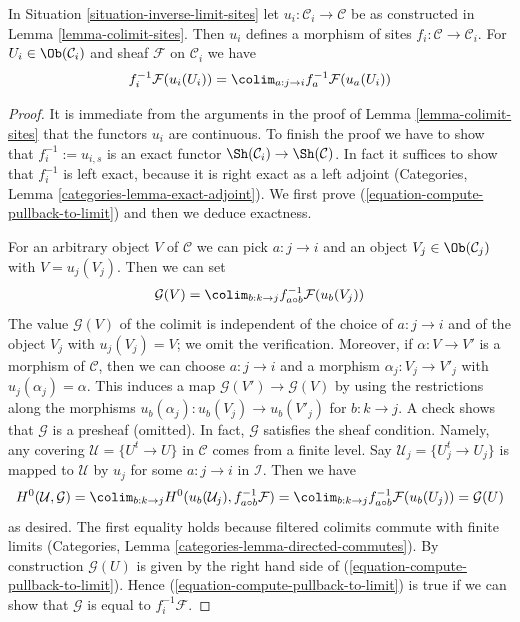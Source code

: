 \begin{lemma}
\label{lemma-compute-pullback-to-limit}
In Situation \ref{situation-inverse-limit-sites} let
$u_i : \mathcal{C}_i \to \mathcal{C}$ be as constructed in
Lemma \ref{lemma-colimit-sites}. Then $u_i$ defines a morphism
of sites $f_i : \mathcal{C} \to \mathcal{C}_i$. For
$U_i \in \Ob(\mathcal{C}_i)$ and sheaf $\mathcal{F}$ on $\mathcal{C}_i$ we have
\begin{equation}
\label{equation-compute-pullback-to-limit}
f_i^{-1}\mathcal{F}(u_i(U_i)) =
\colim_{a : j \to i} f_a^{-1}\mathcal{F}(u_a(U_i))
\end{equation}
\end{lemma}

\begin{proof}
It is immediate from the arguments in the proof of
Lemma \ref{lemma-colimit-sites} that the functors $u_i$ are continuous.
To finish the proof we have to show that $f_i^{-1} := u_{i, s}$
is an exact functor $\Sh(\mathcal{C}_i) \to \Sh(\mathcal{C})$.
In fact it suffices to show that $f_i^{-1}$ is left exact, because
it is right exact as a left adjoint
(Categories, Lemma \ref{categories-lemma-exact-adjoint}).
We first prove (\ref{equation-compute-pullback-to-limit})
and then we deduce exactness.

\medskip\noindent
For an arbitrary object $V$ of $\mathcal{C}$ we can pick $a : j \to i$
and an object $V_j \in \Ob(\mathcal{C}_j)$ with $V = u_j(V_j)$. Then we
can set
$$
\mathcal{G}(V) = \colim_{b : k \to j} f_{a \circ b}^{-1}\mathcal{F}(u_b(V_j))
$$
The value $\mathcal{G}(V)$ of the colimit is independent of the choice
of $a : j \to i$ and of the object $V_j$ with $u_j(V_j) = V$; we omit
the verification. Moreover, if $\alpha : V \to V'$ is a morphism of
$\mathcal{C}$, then we can choose $a : j \to i$ and a morphism
$\alpha_j : V_j \to V'_j$ with $u_j(\alpha_j) = \alpha$. This induces
a map $\mathcal{G}(V') \to \mathcal{G}(V)$ by using the restrictions
along the morphisms $u_b(\alpha_j) : u_b(V_j) \to u_b(V'_j)$ for
$b : k \to j$. A check
shows that $\mathcal{G}$ is a presheaf (omitted).
In fact, $\mathcal{G}$ satisfies the sheaf condition. Namely,
any covering $\mathcal{U} = \{U^t \to U\}$ in $\mathcal{C}$
comes from a finite level. Say $\mathcal{U}_j = \{U^t_j \to U_j\}$
is mapped to $\mathcal{U}$ by $u_j$ for some $a : j \to i$ in $\mathcal{I}$.
Then we have
$$
H^0(\mathcal{U}, \mathcal{G}) =
\colim_{b : k \to j} H^0(u_b(\mathcal{U}_j), f_{a \circ b}^{-1}\mathcal{F}) =
\colim_{b : k \to j} f_{a \circ b}^{-1}\mathcal{F}(u_b(U_j)) =
\mathcal{G}(U)
$$
as desired. The first equality holds because filtered colimits commute
with finite limits
(Categories, Lemma \ref{categories-lemma-directed-commutes}).
By construction $\mathcal{G}(U)$ is given by the right hand side of
(\ref{equation-compute-pullback-to-limit}).
Hence (\ref{equation-compute-pullback-to-limit}) is true if we can
show that $\mathcal{G}$ is equal to $f_i^{-1}\mathcal{F}$.


\end{proof}
